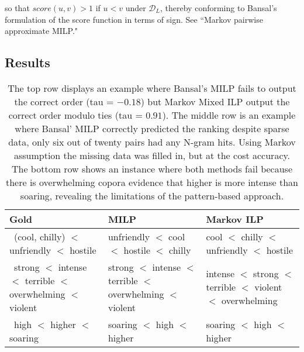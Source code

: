 so that $score(u,v) > 1$ if $u < v$ under $\mathcal{D}_L$, thereby conforming to Bansal's formulation of the score function in terms of sign. See ``Markov pairwise approximate MILP."

\subsection{Results}

\begin{table}
\small
\centering
\begin{tabular}{|l|l|l|}
% 
\hline 
\bf Gold & \bf MILP & \bf Markov ILP \\
\hline
% 
\ \pbox{20cm}{(cool, chilly) \\ $<$ unfriendly \\ $<$ hostile } 
& \pbox{20cm}{unfriendly \\ $<$ cool \\ $<$ hostile \\ $<$ chilly }
& \pbox{20cm}{cool \\ $<$ chilly \\ $<$ unfriendly \\ $<$ hostile } \\
% 
\hline
% 
\ \pbox{20cm}{strong \\ $<$ intense \\ $<$ terrible \\ $<$ overwhelming \\ $<$ violent } 
& \pbox{20cm}{strong \\ $<$ intense \\ $<$ terrible \\ $<$ overwhelming \\ $<$ violent }
& \pbox{20cm}{intense \\ $<$ strong \\ $<$ terrible \\ $<$ violent \\ $<$ overwhelming } \\
% 
\hline
% 
\ \pbox{20cm}{high \\ $<$ higher \\ $<$ soaring }
& \pbox{20cm}{soaring \\ $<$ high \\ $<$ higher \\ }
& \pbox{20cm}{soaring \\ $<$ high \\ $<$ higher \\ }\\
% 
\hline
\end{tabular}
\caption{\label{font-table} The top row displays an example where Bansal's MILP fails to output the correct order (tau = $-0.18$) but Markov Mixed ILP output the correct order modulo ties (tau = $0.91$). The middle row is an example where Bansal' MILP correctly predicted the ranking despite sparse data, only six out of twenty pairs had any N-gram hits. Using Markov assumption the missing data was filled in, but at the cost accuracy. The bottom row shows an instance where both methods fail because there is overwhelming copora evidence that higher is more intense than soaring, revealing the limitations of the pattern-based approach.}
\end{table}

